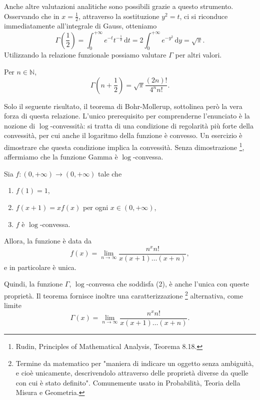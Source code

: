 Anche altre valutazioni analitiche sono possibili grazie a questo strumento. 
Osservando che in $x= \frac{1}{2}$, attraverso la sostituzione $y^2=t$, ci si riconduce immediatamente all'integrale di Gauss, otteniamo 
\begin{equation*}
	\Gamma \left( \frac{1}{2} \right)= \int_{0}^{+ \infty}e^{-t}t^{- \frac{1}{2}} \, \mathrm{d}t=2 \int_{0}^{+ \infty}e^{-y^2} \, \mathrm{d}y= \sqrt{ \pi}.
\end{equation*} 
Utilizzando la relazione funzionale possiamo valutare $ \Gamma$ per altri valori.
\begin{Res} Per $n \in \mathbb{N}$,
	\begin{equation*}
		\Gamma \left(n+ \frac{1}{2} \right) = 
		\sqrt{ \pi} \frac{(2n)!}{4^n n!}.
	\end{equation*}
\end{Res}

Solo il seguente risultato, il teorema di Bohr-Mollerup, sottolinea però la vera forza di questa relazione. 
L'unico prerequisito per comprenderne l'enunciato è la nozione di $ \log$-convessità: si tratta di una condizione di regolarità più forte della convessità, per cui anche il logaritmo della funzione è convesso. 
Un esercizio è dimostrare che questa condizione implica la convessità. 
Senza dimostrazione \footnote{Rudin, Principles of Mathematical Analysis, Teorema 8.18.}, affermiamo che la funzione Gamma è $ \log$-convessa.

\begin{The}
Sia $f:(0,+ \infty) \to(0,+ \infty)$ tale che
\begin{enumerate}
	\item $f(1)=1$,
	\item $f(x+1)=xf(x)$ per ogni $x \in (0,+ \infty)$,
	\item $f$ è $ \log$-convessa.
\end{enumerate}
Allora, la funzione è data da
\begin{equation*}
f(x) = 
\lim_{n \to \infty} \frac{n^x n!}{x(x+1) \dots(x+n)},	
\end{equation*}
e in particolare è unica.
\end{The}
Quindi, la funzione $ \Gamma$, $ \log$-convessa che soddisfa (2), è anche l'unica con queste proprietà. 
Il teorema fornisce inoltre una caratterizzazione \footnote{Termine da matematico per "maniera di indicare un oggetto senza ambiguità, e cioè unicamente, descrivendolo attraverso delle proprietà diverse da quelle con cui è stato definito". 
Comunemente usato in Probabilità, Teoria della Misura e Geometria.} alternativa, come limite
\begin{equation*}
	\Gamma(x) = 
	\lim_{n \to \infty} \frac{n^x n!}{x(x+1) \dots(x+n)}.	
\end{equation*}

\pagebreak